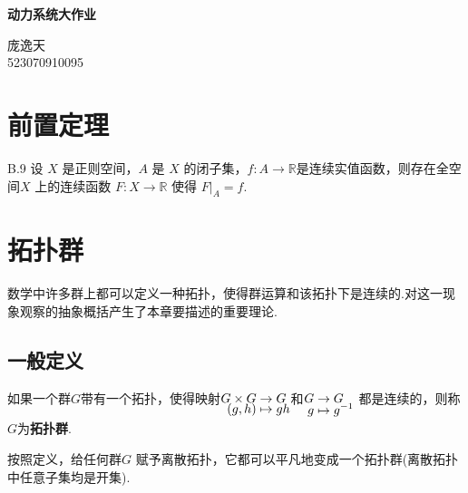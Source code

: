 \documentclass[lang=cn,a4paper,11pt,openany,scheme=chinese]{elegantbook}
\makeatletter
\newcommand{\mb}{\mathbb}
\newcommand{\setjot}[1][0]{\setlength{\jot}{#1 pt}}
\newcommand\setboxcounter[2]{\setcounter{tcb@cnt@#1}{#2}}
\makeatother
\begin{document}
\begin{titlepage}
    \centering
    \vspace*{6cm}
    {\Huge \bfseries 动力系统大作业 \par}
    \vspace{3cm}
    {\Large 庞逸天\\ 523070910095 \par}
    \vfill
\end{titlepage}
\setcounter{page}{1}

\frontmatter
{}     %
\clearpage
\tableofcontents
\clearpage


\mainmatter


\chapter{前置定理}
\setcounter{chapter}{2}
\setboxcounter{theorem}{8}
\begin{theorem}{B.9}
    设 $X$ 是正则空间，$A$ 是 $X$ 的闭子集，$f:A\to\mb{R}$是连续实值函数，则存在全空间$X$ 上的连续函数 $F:X\to \mb{R}$ 使得 $F|_A=f$.
\end{theorem}

\setcounter{chapter}{2}
\chapter{拓扑群}

数学中许多群上都可以定义一种拓扑，使得群运算和该拓扑下是连续的.对这一现象观察的抽象概括产生了本章要描述的重要理论.

\section{一般定义}


\begin{definition}[拓扑群]
    如果一个群$G$带有一个拓扑，使得映射$\setjot[-4]\begin{aligned}[t]
        G\times G &\to G \\
        (g,h) &\mapsto gh
    \end{aligned}$和$\setjot[-4]\begin{aligned}[t]
        G &\to G \\
        g &\mapsto g^{-1}
    \end{aligned}$
    都是连续的，则称$G$为\textbf{拓扑群}.
\end{definition}
\begin{remark}
    按照定义，给任何群$G$ 赋予离散拓扑，它都可以平凡地变成一个拓扑群(离散拓扑中任意子集均是开集).
\end{remark}
\end{document}

